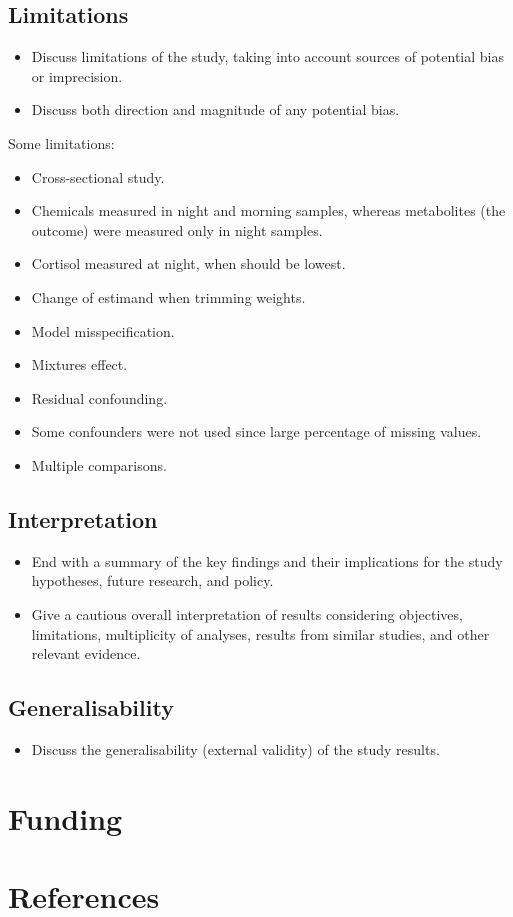 \documentclass[
  letterpaper,
  DIV=11,
  numbers=noendperiod]{scrartcl}
\providecommand{\tightlist}{%
  \setlength{\itemsep}{0pt}\setlength{\parskip}{0pt}}\usepackage{longtable,booktabs,array}
\begin{document}
\subsection{Limitations}\label{sec-limitations}

\begin{itemize}
\tightlist
\item
  Discuss limitations of the study, taking into account sources of
  potential bias or imprecision.
\item
  Discuss both direction and magnitude of any potential bias.
\end{itemize}

Some limitations:

\begin{itemize}
\tightlist
\item
  Cross-sectional study.
\item
  Chemicals measured in night and morning samples, whereas metabolites
  (the outcome) were measured only in night samples.
\item
  Cortisol measured at night, when should be lowest.
\item
  Change of estimand when trimming weights.
\item
  Model misspecification.
\item
  Mixtures effect.
\item
  Residual confounding.
\item
  Some confounders were not used since large percentage of missing
  values.
\item
  Multiple comparisons.
\end{itemize}

\subsection{Interpretation}\label{sec-interpretation}

\begin{itemize}
\tightlist
\item
  End with a summary of the key findings and their implications for the
  study hypotheses, future research, and policy.
\item
  Give a cautious overall interpretation of results considering
  objectives, limitations, multiplicity of analyses, results from
  similar studies, and other relevant evidence.
\end{itemize}

\subsection{Generalisability}\label{sec-general}

\begin{itemize}
\tightlist
\item
  Discuss the generalisability (external validity) of the study results.
\end{itemize}

\newpage

\section{Funding}\label{funding}

\newpage

\section*{References}\label{references}
\end{document}
